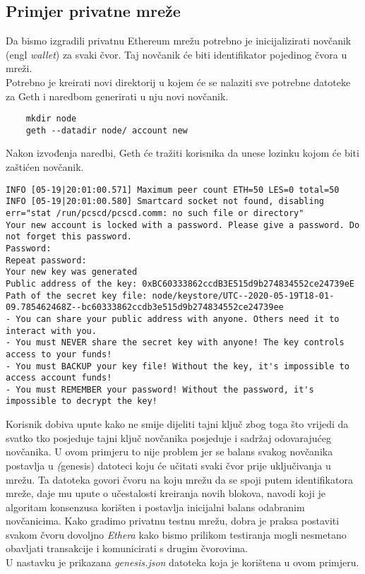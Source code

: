 \documentclass[times, utf8, zavrsni]{fer}
\begin{document}
\subsection{Primjer privatne mreže}
Da bismo izgradili privatnu Ethereum mrežu potrebno je inicijalizirati novčanik (engl \emph{wallet}) za svaki čvor. Taj novčanik
će biti identifikator pojedinog čvora u mreži. \\
Potrebno je kreirati novi direktorij u kojem će se nalaziti sve potrebne datoteke za Geth i naredbom generirati u nju novi novčanik.

\begin{lstlisting}
    mkdir node
    geth --datadir node/ account new
\end{lstlisting}

Nakon izvođenja naredbi, Geth će tražiti korisnika da unese lozinku kojom će biti zaštićen novčanik.

\begin{lstlisting}
INFO [05-19|20:01:00.571] Maximum peer count ETH=50 LES=0 total=50
INFO [05-19|20:01:00.580] Smartcard socket not found, disabling err="stat /run/pcscd/pcscd.comm: no such file or directory"
Your new account is locked with a password. Please give a password. Do not forget this password.
Password: 
Repeat password: 
Your new key was generated
Public address of the key: 0xBC60333862ccdB3E515d9b274834552ce24739eE
Path of the secret key file: node/keystore/UTC--2020-05-19T18-01-09.785462468Z--bc60333862ccdb3e515d9b274834552ce24739ee
- You can share your public address with anyone. Others need it to interact with you.
- You must NEVER share the secret key with anyone! The key controls access to your funds!
- You must BACKUP your key file! Without the key, it's impossible to access account funds!
- You must REMEMBER your password! Without the password, it's impossible to decrypt the key!
\end{lstlisting}

Korisnik dobiva upute kako ne smije dijeliti tajni ključ zbog toga što vrijedi da svatko tko posjeduje tajni ključ novčanika
posjeduje i sadržaj odovarajućeg novčanika. U ovom primjeru to nije problem jer se balans svakog novčanika postavlja u \emph(genesis)
datoteci koju će učitati svaki čvor prije uključivanja u mrežu. Ta datoteka govori čvoru na koju mrežu da se spoji putem identifikatora
mreže, daje mu upute o učestalosti kreiranja novih blokova, navodi koji je algoritam konsenzusa korišten i postavlja inicijalni balans
odabranim novčanicima. Kako gradimo privatnu testnu mrežu, dobra je praksa postaviti svakom čvoru dovoljno \emph{Ethera} kako bismo
prilikom testiranja mogli nesmetano obavljati transakcije i komunicirati s drugim čvorovima. \\
U nastavku je prikazana \emph{genesis.json} datoteka koja je korištena u ovom primjeru.
\end{document}
